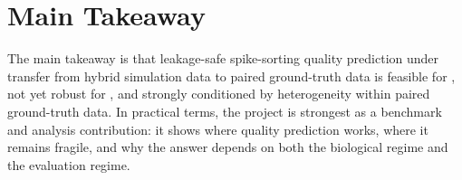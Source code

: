 \section{Main Takeaway}

The main takeaway is that leakage-safe spike-sorting quality prediction under transfer from hybrid simulation data to paired ground-truth data is feasible for \fpos{}, not yet robust for \fmiss{}, and strongly conditioned by heterogeneity within paired ground-truth data. In practical terms, the project is strongest as a benchmark and analysis contribution: it shows where quality prediction works, where it remains fragile, and why the answer depends on both the biological regime and the evaluation regime.
